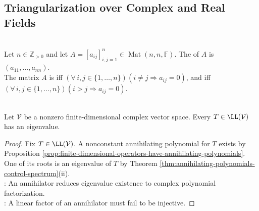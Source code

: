 \subsection{Triangularization over Complex and Real Fields}

\begin{definition} \label{def:diagonal-and-upper-triangular-matrices} \\
Let $n\in\mathbb{Z}_{>0}$ and let $A=[a_{ij}]_{i,j=1}^{n}\in\operatorname{Mat}(n,n,\mathbb{F})$. The  of $A$ is $(a_{11},\ldots,a_{nn})$.\\
The matrix $A$ is  iff $(\forall\,i,j\in\{1,\ldots,n\})(i\neq j\Rightarrow a_{ij}=0)$, and  iff $(\forall\,i,j\in\{1,\ldots,n\})(i>j\Rightarrow a_{ij}=0)$.
\end{definition}

\begin{theorem} \label{thm:complex-operator-has-eigenvalue} \\
Let $\mathcal{V}$ be a nonzero finite-dimensional complex vector space. Every $T\in\LL(\mathcal{V})$ has an eigenvalue.
\begin{proof}
Fix $T\in\LL(\mathcal{V})$. A nonconstant annihilating polynomial for $T$ exists by Proposition \ref{prop:finite-dimensional-operators-have-annihilating-polynomials}.\\
One of its roots is an eigenvalue of $T$ by Theorem \ref{thm:annihilating-polynomials-control-spectrum}(ii).\\
: An annihilator reduces eigenvalue existence to complex polynomial factorization.\\
: A linear factor of an annihilator must fail to be injective.
\end{proof}
\end{theorem}

